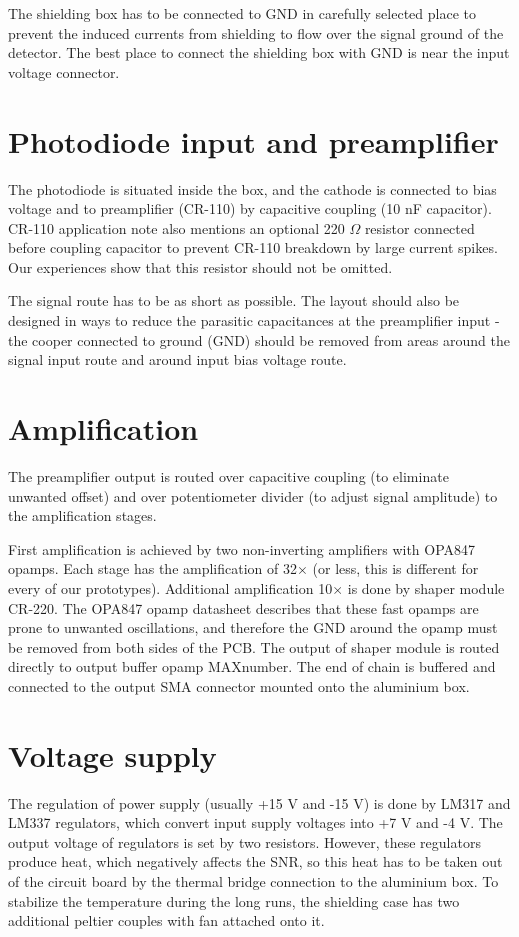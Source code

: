 \par
The shielding box has to be connected to GND in carefully selected place to prevent the induced currents from shielding to flow over the signal ground of the detector. The best place to connect the shielding box with GND is near the input voltage connector.


\section{Photodiode input and preamplifier}
The photodiode is situated inside the box, and the cathode is connected to bias voltage and to preamplifier (CR-110) by capacitive coupling (10 nF capacitor). CR-110 application note also mentions an optional 220 $\Omega$ resistor connected before coupling capacitor to prevent CR-110 breakdown by large current spikes. Our experiences show that this resistor should not be omitted.

\par
The signal route has to be as short as possible. The layout should also be designed in ways to reduce the parasitic capacitances at the preamplifier input - the cooper connected to ground (GND) should be removed from areas around the signal input route and around input bias voltage route. 

\section{Amplification}
The preamplifier output is routed over capacitive coupling (to eliminate unwanted offset) and over potentiometer divider (to adjust signal amplitude) to the amplification stages. 

First amplification is achieved by two non-inverting amplifiers with OPA847 opamps. Each stage has the amplification of 32$\times$ (or less, this is different for every of our prototypes). Additional amplification 10$\times$ is done by shaper module CR-220. The OPA847 opamp datasheet \cite{OPA847} describes that these fast opamps are prone to unwanted oscillations, and therefore the GND around the opamp must be removed from both sides of the PCB. The output of shaper module is routed directly to output buffer opamp MAXnumber. The end of chain is buffered and connected to the output SMA connector mounted onto the aluminium box.

\par



\section{Voltage supply}
The regulation of power supply (usually +15 V and -15 V) is done by LM317 and LM337 regulators, which convert input supply voltages into +7 V and -4 V. The output voltage of regulators is set by two resistors. However, these regulators produce heat, which negatively affects the SNR, so this heat has to be taken out of the circuit board by the thermal bridge connection to the aluminium box. To stabilize the temperature during the long runs, the shielding case has two additional peltier couples with fan attached onto it.


